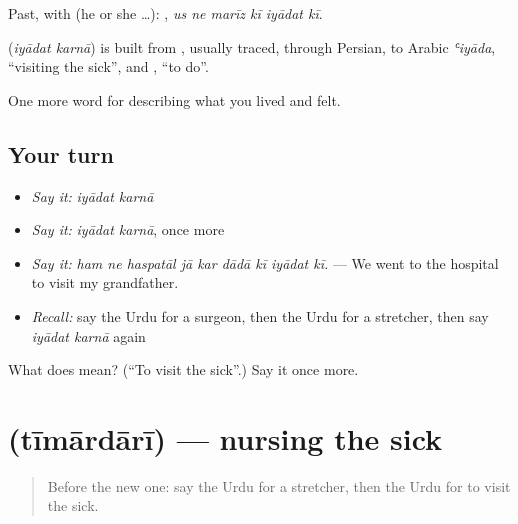 Past, with  (he or she …):      , \emph{us ne marīz kī iyādat kī}.

\begin{cousinweb}
\textbf{ } (\emph{iyādat karnā}) is built from \textbf{}, usually traced, through Persian, to Arabic \emph{ʿiyāda}, \textquotedblleft{}visiting the sick\textquotedblright{}, and \textbf{}, \textquotedblleft{}to do\textquotedblright{}.
\end{cousinweb}

\begin{grammarlens}[title={What you've built}]
One more word for describing what you lived and felt.
\end{grammarlens}

\subsection*{Your turn}
\begin{itemize}
\raggedright
  \item \emph{Say it:} \emph{iyādat karnā}
  \item \emph{Say it:} \emph{iyādat karnā}, once more
  \item \emph{Say it:} \emph{ham ne haspatāl jā kar dādā kī iyādat kī.} — We went to the hospital to visit my grandfather.
  \item \emph{Recall:} say the Urdu for a surgeon, then the Urdu for a stretcher, then say \emph{iyādat karnā} again
\end{itemize}

\begin{tcolorbox}[breakable,colback=teal!4,colframe=teal!35!black,title={Before you move on}]
What does   mean? (\textquotedblleft{}To visit the sick\textquotedblright{}.) Say it once more.
\end{tcolorbox}
\section[\texorpdfstring{\ur{تیمارداری} (tīmārdārī)}{تیمارداری (tīmārdārī)}]{ (tīmārdārī) — nursing the sick}

\label{lesson:UR-C480-timardari}



\begin{quote}
Before the new one: say the Urdu for a stretcher, then the Urdu for to visit the sick.
\end{quote}

